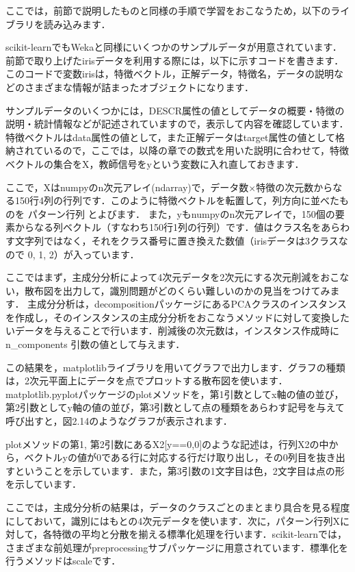 ここでは，前節で説明したものと同様の手順で学習をおこなうため，以下のライブラリを読み込みます．


scikit-learnでもWekaと同様にいくつかのサンプルデータが用意されています．前節で取り上げたirisデータを利用する際には，以下に示すコードを書きます．このコードで変数irisは，特徴ベクトル，正解データ，特徴名，データの説明などのさまざまな情報が詰まったオブジェクトになります．


サンプルデータのいくつかには，DESCR属性の値としてデータの概要・特徴の説明・統計情報などが記述されていますので，表示して内容を確認しています．
特徴ベクトルはdata属性の値として，また正解データはtarget属性の値として格納されているので，ここでは，以降の章での数式を用いた説明に合わせて，特徴ベクトルの集合をX，教師信号をyという変数に入れ直しておきます．

ここで，Xはnumpyのn次元アレイ(ndarray)で，データ数$\times$特徴の次元数からなる150行4列の行列です．このように特徴ベクトルを転置して，列方向に並べたものを
パターン行列
とよびます．
また，yもnumpyのn次元アレイで，150個の要素からなる列ベクトル（すなわち150行1列の行列）です．値はクラス名をあらわす文字列ではなく，それをクラス番号に置き換えた数値（irisデータは3クラスなので 0, 1, 2）が入っています．

ここではまず，主成分分析によって4次元データを2次元にする次元削減をおこない，散布図を出力して，識別問題がどのくらい難しいのかの見当をつけてみます．
主成分分析は，decompositionパッケージにあるPCAクラスのインスタンスを作成し，そのインスタンスの主成分分析をおこなうメソッドに対して変換したいデータを与えることで行います．削減後の次元数は，インスタンス作成時に n\_components 引数の値として与えます．

この結果を，matplotlibライブラリを用いてグラフで出力します．グラフの種類は，2次元平面上にデータを点でプロットする散布図を使います．
matplotlib.pyplotパッケージのplotメソッドを，第1引数としてx軸の値の並び，第2引数としてy軸の値の並び，第3引数として点の種類をあらわす記号を与えて呼び出すと，図2.14のようなグラフが表示されます．


plotメソッドの第1, 第2引数にあるX2[y==0,0]のような記述は，行列X2の中から，ベクトルyの値が0である行に対応する行だけ取り出し，その0列目を抜き出すということを示しています．また，第3引数の1文字目は色，2文字目は点の形を示しています．

ここでは，主成分分析の結果は，データのクラスごとのまとまり具合を見る程度にしておいて，識別にはもとの4次元データを使います．次に，パターン行列Xに対して，各特徴の平均と分散を揃える標準化処理を行います．scikit-learnでは，さまざまな前処理がpreprocessingサブパッケージに用意されています．標準化を行うメソッドはscaleです．

